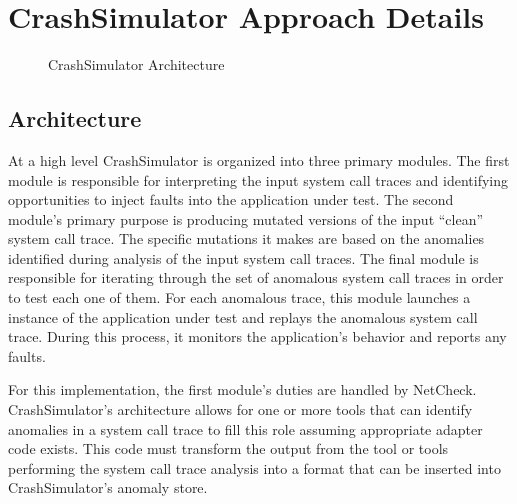 \section{CrashSimulator Approach Details}

    \begin{figure}[t]
        \center{}
        \caption{CrashSimulator Architecture}
    \end{figure}

    \subsection{Architecture}

        At a high level CrashSimulator is organized into three primary modules. The first module is responsible for
        interpreting the input system call traces and identifying opportunities to inject faults into the application
        under test. The second module's primary purpose is producing mutated versions of the input ``clean'' system call
        trace. The specific mutations it makes are based on the anomalies identified during analysis of the input system
        call traces. The final module is responsible for iterating through the set of anomalous system call traces in
        order to test each one of them. For each anomalous trace, this module launches a instance of the application
        under test and replays the anomalous system call trace. During this process, it monitors the application's
        behavior and reports any faults.

        For this implementation, the first module's duties are handled by NetCheck. CrashSimulator's architecture allows
        for one or more tools that can identify anomalies in a system call trace to fill this role assuming appropriate
        adapter code exists. This code must transform the output from the tool or tools performing the system call trace
        analysis into a format that can be inserted into CrashSimulator's anomaly store.

